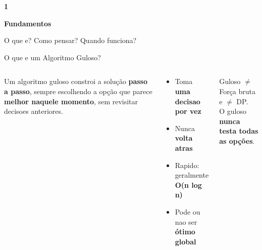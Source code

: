 \documentclass[aspectratio=169,10pt]{beamer}
\begin{document}
{
\begin{frame}[noframenumbering]
  \centering\vspace{1.0cm}
  {\fontsize{36}{44}\selectfont\bfseries\color{gemaBlue} 1}\par
  \vspace{0.25cm}
  {\Large\color{greedyGold}\bfseries Fundamentos}\par
  \vspace{0.15cm}
  {\color{gray}\small O que e? Como pensar? Quando funciona?}
\end{frame}
}

\begin{frame}{O que e um Algoritmo Guloso?}
  \begin{columns}[c]
      \begin{tcolorbox}[caixaDourada,title={Definição}]
        \small
        Um algoritmo guloso constroi a solução
        \textbf{passo a passo}, sempre escolhendo
        a opção que parece \textbf{melhor naquele momento},
        sem revisitar decisoes anteriores.
      \end{tcolorbox}
      \vspace{0.12cm}
      \begin{tcolorbox}[caixaAzul,title={Características}]
        \begin{itemize}\footnotesize
          \item Toma \textbf{uma decisao por vez}
          \item Nunca \textbf{volta atras}
          \item Rapido: geralmente \textbf{O(n log n)}
          \item Pode ou nao ser \textbf{ótimo global}
        \end{itemize}
      \end{tcolorbox}
      \vspace{0.12cm}
      \begin{tcolorbox}[caixaVermelho,title={Diferença crucial}]
        \footnotesize
        Guloso $\neq$ Força bruta e $\neq$ DP.\\
        O guloso \textbf{nunca testa todas as opções}.
      \end{tcolorbox}
      \centering

\end{columns}
\end{frame}
\end{document}
